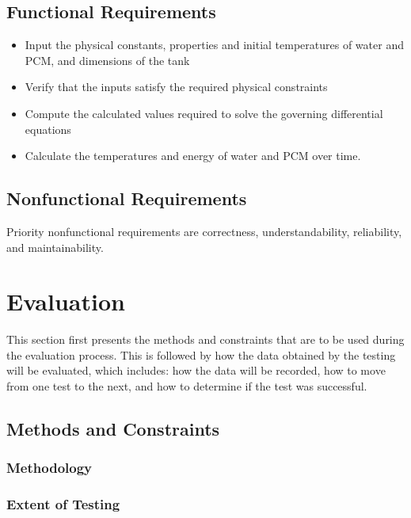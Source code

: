 \documentclass[12pt]{article}
\begin{document}
\subsection{Functional Requirements}

\noindent
\begin{itemize}
\item Input the physical constants, properties and initial temperatures of water
 and PCM, and dimensions of the tank  
\item Verify that the inputs satisfy the required physical constraints 
\item Compute the calculated values required to solve the governing differential equations
\item Calculate the temperatures and energy of water and PCM over time.
\end{itemize} 

\subsection{Nonfunctional Requirements}
Priority nonfunctional requirements are correctness, understandability,
reliability, and maintainability.


%
%

\section{Evaluation}
This section first presents the methods and constraints that are to be used
during the evaluation process. This is followed by how the data obtained by the
testing will be evaluated, which includes: how the data will be recorded, how to
move from one test to the next, and how to determine if the test was successful.

\subsection{ Methods and Constraints} 

\subsubsection{Methodology} 

\subsubsection{Extent of Testing}
\end{document}
